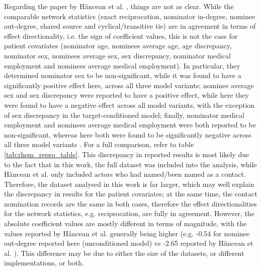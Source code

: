Regarding the paper by H\^ancean et al. \cite{hancean2022occupations}, things are not as clear. While the comparable network statistics (exact reciprocation, nominator in-degree, nominee out-degree, shared source and cyclical/transitive tie) are in agreement in terms of effect directionality, i.e. the sign of coefficient values, this is not the case for patient covariates (nominator age, nominees average age, age discrepancy, nominator sex, nominees average sex, sex discrepancy, nominator medical employment and nominees average medical employment). In particular, they determined nominator sex to be non-significant, while it was found to have a significantly positive effect here, across all three model variants; nominee average sex and sex discrepancy were reported to have a positive effect, while here they were found to have a negative effect across all model variants, with the exception of sex discrepancy in the target-conditioned model; finally, nominator medical employment and nominees average medical employment were both reported to be non-significant, whereas here both were found to be significantly negative across all three model variants \cite{hancean2022occupations}. For a full comparison, refer to table \ref{tab:rhem_repro_table}. This discrepancy in reported results is most likely due to the fact that in this work, the full dataset was included into the analysis, while H\^ancean et al. only included actors who had named/been named as a contact. Therefore, the dataset analysed in this work is far larger, which may well explain the discrepancy in results for the patient covariates; at the same time, the contact nomination records are the same in both cases, therefore the effect directionalities for the network statistics, e.g. reciprocation, are fully in agreement. However, the absolute coefficient values are mostly different in terms of magnitude, with the values reported by H\^ancean et al. generally being higher (e.g. -0.54 for nominee out-degree reported here (unconditioned model) vs -2.65 reported by H\^ancean et al. \cite{hancean2022occupations}). This difference may be due to either the size of the datasets, or different implementations, or both.

